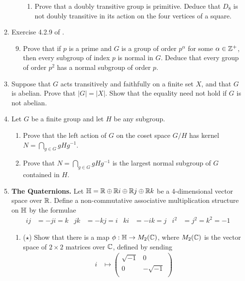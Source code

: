 \documentclass[../psets.tex]{subfiles}
\begin{document}
\begin{enumerate}
\begin{enumerate}[label={\textbf{\arabic*.}}]
\begin{enumerate}[label={\textbf{(\alph*)}}]
            \item Prove that a doubly transitive group is primitive. Deduce that $D_8$ is not doubly transitive in its action on the four vertices of a square.
        \end{enumerate}
    \end{enumerate}
    \item Exercise 4.2.9 of \textcite{bib:DummitFoote}.
    \begin{enumerate}[label={\textbf{\arabic*.}}]
        \setcounter{enumii}{8}
        \item Prove that if $p$ is a prime and $G$ is a group of order $p^\alpha$ for some $\alpha\in\mathbb{Z}^+$, then every subgroup of index $p$ is normal in $G$. Deduce that every group of order $p^2$ has a normal subgroup of order $p$.
    \end{enumerate}
    \item Suppose that $G$ acts transitively and faithfully on a finite set $X$, and that $G$ is abelian. Prove that $|G|=|X|$. Show that the equality need not hold if $G$ is not abelian.
    \item Let $G$ be a finite group and let $H$ be any subgroup.
    \begin{enumerate}
        \item Prove that the left action of $G$ on the coset space $G/H$ has kernel $N=\bigcap_{g\in G}gHg^{-1}$.
        \item Prove that $N=\bigcap_{g\in G}gHg^{-1}$ is the largest normal subgroup of $G$ contained in $H$.
    \end{enumerate}
    \item \textbf{The Quaternions.} Let $\mathbb{H}=\mathbb{R}\oplus\mathbb{R} i\oplus\mathbb{R} j\oplus\mathbb{R} k$ be a 4-dimensional vector space over $\mathbb{R}$. Define a non-commutative associative multiplication structure on $\mathbb{H}$ by the formulae
    \begin{align*}
        ij &= -ji = k&
        jk &= -kj = i&
        ki &= -ik = j&
        i^2 &= j^2 = k^2 = -1
    \end{align*}
    \begin{enumerate}
        \item ($\star$) Show that there is a map $\phi:\mathbb{H}\to M_2(\mathbb{C})$, where $M_2(\mathbb{C})$ is the vector space of $2\times 2$ matrices over $\mathbb{C}$, defined by sending
        \begin{align*}
            i &\mapsto
            \begin{pmatrix}
                \sqrt{-1} & 0\\
                0 & -\sqrt{-1}\\

\end{pmatrix}
\end{align*}
\end{enumerate}
\end{enumerate}
\end{document}
